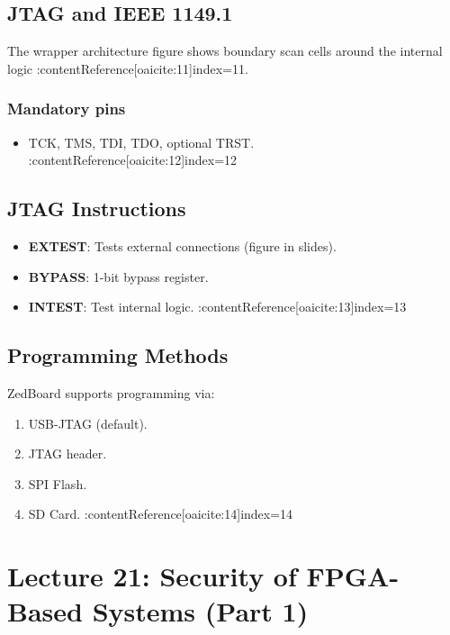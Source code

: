 \documentclass[11pt]{article}
\begin{document}
\subsection{JTAG and IEEE 1149.1}
The wrapper architecture figure shows boundary scan cells around the internal logic
:contentReference[oaicite:11]{index=11}.

\subsubsection*{Mandatory pins}
\begin{itemize}
    \item TCK, TMS, TDI, TDO, optional TRST. :contentReference[oaicite:12]{index=12}
\end{itemize}

\subsection{JTAG Instructions}
\begin{itemize}
    \item \textbf{EXTEST}: Tests external connections (figure in slides).
    \item \textbf{BYPASS}: 1-bit bypass register.
    \item \textbf{INTEST}: Test internal logic. :contentReference[oaicite:13]{index=13}
\end{itemize}

\subsection{Programming Methods}
ZedBoard supports programming via:
\begin{enumerate}
    \item USB-JTAG (default).
    \item JTAG header.
    \item SPI Flash.
    \item SD Card. :contentReference[oaicite:14]{index=14}
\end{enumerate}

\newpage

\section{Lecture 21: Security of FPGA-Based Systems (Part 1)}
\end{document}
